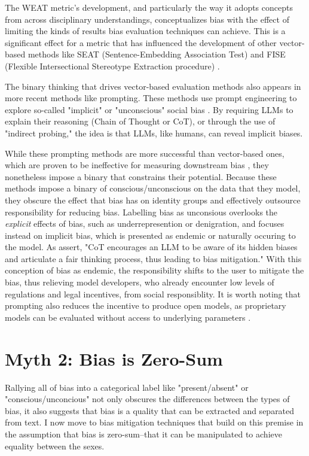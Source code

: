 \documentclass[11pt]{article}
\begin{document}
The WEAT metric's development, and particularly the way it adopts
concepts from across disciplinary understandings, conceptualizes bias
with the effect of limiting the kinds of results bias evaluation
techniques can achieve. This is a significant effect for a metric that
has influenced the development of other vector-based methods like SEAT
(Sentence-Embedding Association Test) and FISE (Flexible
Intersectional Stereotype Extraction
procedure) \citep{caliskan:2017,may:2019,charlesworth:2024}.

The binary thinking that drives vector-based evaluation methods also
appears in more recent methods like prompting. These methods use
prompt engineering to explore so-called "implicit" or "unconscious"
social bias \citep{kaneko:2024,Dong:2024}. By requiring LLMs to
explain their reasoning (Chain of Thought or CoT), or through the use
of "indirect probing," the idea is that LLMs, like humans, can reveal
implicit biases.

While these prompting methods are more successful than vector-based
ones, which are proven to be ineffective for measuring downstream
bias \citep{gonen:2019}, they nonetheless impose a binary that
constrains their potential. Because these methods impose a binary of
conscious/unconscious on the data that they model, they obscure the
effect that bias has on identity groups and effectively outsource
responsibility for reducing bias. Labelling bias as unconsious
overlooks the \emph{explicit} effects of bias, such as
underrepresention or denigration, and focuses instead on implicit
bias, which is presented as endemic or naturally occuring to the
model. As
\citet{kaneko:2024} assert, "CoT encourages an LLM to be aware of its
hidden biases and articulate a fair thinking process, thus leading to
bias mitigation." With this conception of bias as endemic, the
responsibility shifts to the user to mitigate the bias, thus relieving
model developers, who already encounter low levels of regulations and
legal incentives, from social responsiblity. It is worth noting that
prompting also reduces the incentive to produce open models, as
proprietary models can be evaluated without access to underlying
parameters \citep{thakur:2023,furniturewala:2024}.

\section{Myth 2: Bias is Zero-Sum}

Rallying all of bias into a categorical label like "present/absent" or
"conscious/unconcious" not only obscures the differences between the
types of bias, it also suggests that bias is a quality that can be
extracted and separated from text. I now move to bias mitigation
techniques that build on this premise in the assumption that bias is
zero-sum--that it can be manipulated to achieve equality between the
sexes.
\end{document}
